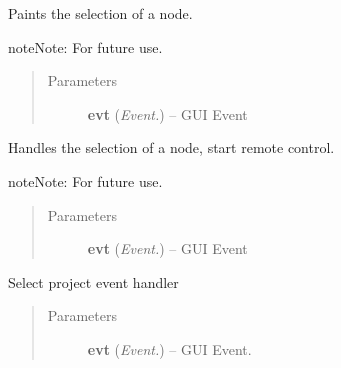 \documentclass[letterpaper,10pt,english]{sphinxmanual}
\begin{document}
\begin{fulllineitems}
\begin{fulllineitems}
\label{api:wos.GUI.PaintSelect}
Paints the selection of a node.

\begin{notice}{note}{Note:}
For future use.
\end{notice}
\begin{quote}\begin{description}
\item[{Parameters}] \leavevmode
\textbf{evt} (\emph{Event.}) -- GUI Event

\end{description}\end{quote}

\end{fulllineitems}


\begin{fulllineitems}
\label{api:wos.GUI.SelectNode}
Handles the selection of a node, start remote control.

\begin{notice}{note}{Note:}
For future use.
\end{notice}
\begin{quote}\begin{description}
\item[{Parameters}] \leavevmode
\textbf{evt} (\emph{Event.}) -- GUI Event

\end{description}\end{quote}

\end{fulllineitems}


\begin{fulllineitems}
\label{api:wos.GUI.SelectProjectDialog}
Select project event handler
\begin{quote}\begin{description}
\item[{Parameters}] \leavevmode
\textbf{evt} (\emph{Event.}) -- GUI Event.

\end{description}\end{quote}


\end{fulllineitems}
\end{fulllineitems}
\end{document}
